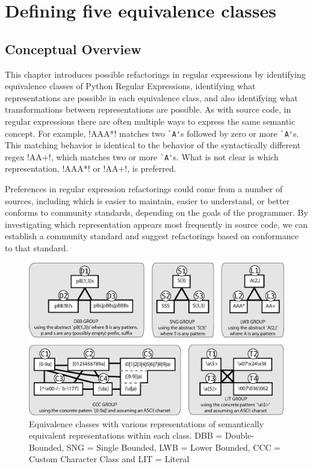 \section{Defining five equivalence classes}
\label{sec:equivClasses}

\subsection{Conceptual Overview}
This chapter introduces possible refactorings in regular expressions by identifying equivalence classes of Python Regular Expressions, identifying what representations are possible in each equivalence class, and also identifying what transformations between representations are possible. As with source code, in regular expressions there are often multiple ways to express the same semantic concept.
For example, \cverb!AAA*! matches two \verb!`A'!s followed by zero or more \verb!`A'!s.  This matching behavior is identical to the behavior of the syntactically different regex \cverb!AA+!, which matches two or more \verb!`A'!s.  What is not clear is which representation,  \cverb!AAA*!  or  \cverb!AA+!, is preferred.

Preferences in regular expression refactorings could come from a number of sources, including which is easier to maintain, easier to understand, or better conforms to community standards, depending on the goals of the programmer.  By investigating which representation appears most frequently in source code, we can establish a community standard and suggest refactorings based on conformance to that standard.


\begin{figure}[tb]
\centering
\includegraphics[width=\textwidth]{nontex/illustrations/refactoringTree.eps}
\vspace{-12pt}
\caption{Equivalence classes with various representations of semantically equivalent representations within each class. DBB = Double-Bounded, SNG = Single Bounded, LWB = Lower Bounded, CCC = Custom Character Class and LIT = Literal}
\vspace{-6pt}
\label{fig:refactoringTree}
\end{figure}

